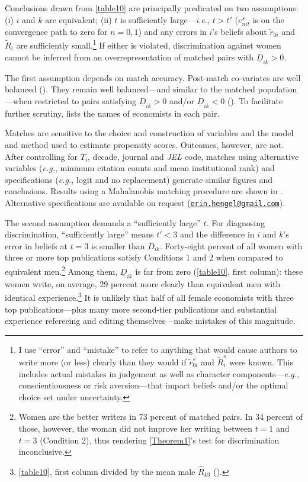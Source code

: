 Conclusions drawn from \autoref{table10} are principally predicated on two assumptions: (i) $i$ and $k$ are equivalent; (ii) $t$ is sufficiently large---\emph{i.e.}, $t>t'$ ($e_{nit}^s$ is on the convergence path to zero for $n=0,1$) and any errors in $i$'s beliefs about $\widetilde r_{0i}$ and $\widetilde R_i$ are sufficiently small.\footnote{\label{Footnote84}I use ``error'' and ``mistake'' to refer to anything that would cause authors to write more (or less) clearly than they would if $\widetilde r_{0i}^s$ and $\widetilde R_i^s$ were known. This includes actual mistakes in judgement as well as character components---\emph{e.g.}, conscientiousness or risk aversion---that impact beliefs and\slash or the optimal choice set under uncertainty.} If either is violated, discrimination against women cannot be inferred from an overrepresentation of matched pairs with $\underline D_{ik}>0$.

The first assumption depends on match accuracy. Post-match co-variates are well balanced (). They remain well balanced---and similar to the matched population---when restricted to pairs satisfying $\underline D_{ik}>0$ and\slash or $\underline D_{ik}<0$ (). To facilitate further scrutiny,  lists the names of economists in each pair.

Matches are sensitive to the choice and construction of variables and the model and method used to estimate propensity scores. Outcomes, however, are not. After controlling for $T_i$, decade, journal and \emph{JEL} code, matches using alternative variables (\emph{e.g.}, minimum citation counts and mean institutional rank) and specifications (\emph{e.g.}, logit and no replacement) generate similar figures and conclusions. Results using a Mahalanobis matching procedure are shown in . Alternative specifications are available on request (\href{mailto:erin.hengel@gmail.com}{\texttt{erin.hengel@gmail.com}}).

The second assumption demands a ``sufficiently large'' $t$. For diagnosing discrimination, ``sufficiently large'' means $t'<3$ and the difference in $i$ and $k$'s error in beliefs at $t=3$ is smaller than $D_{ik}$. Forty-eight percent of all women with three or more top publications satisfy Conditions 1 and 2 when compared to equivalent men.\footnote{Women are the better writers in 73 percent of matched pairs. In 34 percent of those, however, the woman did not improve her writing between $t=1$ and $t=3$ (Condition 2), thus rendering \autoref{Theorem1}'s test for discrimination inconclusive.} Among them, $\underline D_{ik}$ is far from zero (\autoref{table10}, first column): these women write, on average, 29 percent more clearly than equivalent men with identical experience.\footnote{\autoref{table10}, first column divided by the mean male $\widehat R_{k3}$ ().} It is unlikely that half of all female economists with three top publications---plus many more second-tier publications and substantial experience refereeing and editing themselves---make mistakes of this magnitude.

